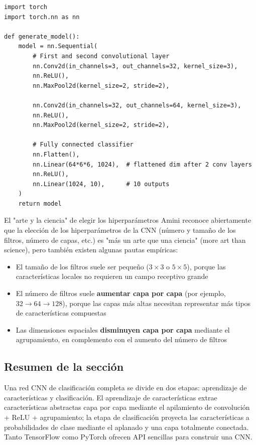 \begin{lstlisting}[caption={Implementación de CNN en PyTorch}]
import torch
import torch.nn as nn

def generate_model():
    model = nn.Sequential(
        # First and second convolutional layer
        nn.Conv2d(in_channels=3, out_channels=32, kernel_size=3),
        nn.ReLU(),
        nn.MaxPool2d(kernel_size=2, stride=2),

        nn.Conv2d(in_channels=32, out_channels=64, kernel_size=3),
        nn.ReLU(),
        nn.MaxPool2d(kernel_size=2, stride=2),

        # Fully connected classifier
        nn.Flatten(),
        nn.Linear(64*6*6, 1024),  # flattened dim after 2 conv layers
        nn.ReLU(),
        nn.Linear(1024, 10),      # 10 outputs
    )
    return model
\end{lstlisting}

\begin{knowledgebox}{El "arte y la ciencia" de elegir los hiperparámetros}
Amini reconoce abiertamente que la elección de los hiperparámetros de la CNN (número y tamaño de los filtros, número de capas, etc.) es "más un arte que una ciencia" (more art than science), pero también existen algunas pautas empíricas:
\begin{itemize}
    \item El tamaño de los filtros suele ser pequeño ($3 \times 3$ o $5 \times 5$), porque las características locales no requieren un campo receptivo grande
    \item El número de filtros suele \textbf{aumentar capa por capa} (por ejemplo, $32 \rightarrow 64 \rightarrow 128$), porque las capas más altas necesitan representar más tipos de características compuestas
    \item Las dimensiones espaciales \textbf{disminuyen capa por capa} mediante el agrupamiento, en complemento con el aumento del número de filtros
\end{itemize}
\end{knowledgebox}

\subsection{Resumen de la sección}

Una red CNN de clasificación completa se divide en dos etapas: aprendizaje de características y clasificación. El aprendizaje de características extrae características abstractas capa por capa mediante el apilamiento de convolución + ReLU + agrupamiento; la etapa de clasificación proyecta las características a probabilidades de clase mediante el aplanado y una capa totalmente conectada. Tanto TensorFlow como PyTorch ofrecen API sencillas para construir una CNN.

\newpage
